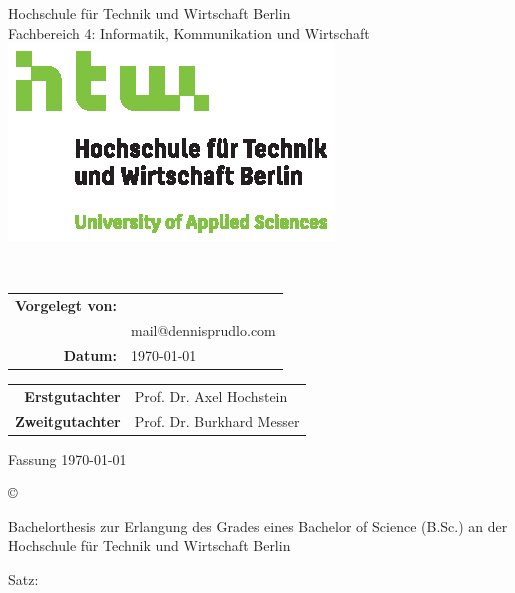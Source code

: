 \pagestyle{empty}

%
\begin{center}
	\footnotesize{%
		Hochschule für Technik und Wirtschaft Berlin\\
		Fachbereich 4: Informatik, Kommunikation und Wirtschaft
	}\\[20pt]
	\includegraphics[scale=1]{images/htwlogo}\\[40pt]
	\begin{spacing}{1.5}
		\Large{\textbf{\thetitle}}\normalsize\\[40pt]
	\end{spacing}
\end{center}
\begin{center}
	\begin{tabular}{ r l }
		\textbf{Vorgelegt von:} & \theauthor \\
		& mail@dennisprudlo.com \\[20pt]
		\textbf{Datum:} & \today
	\end{tabular}
	\mbox{}\vfill
	\begin{tabular}{ r l }
		\textbf{Erstgutachter} & Prof. Dr. Axel Hochstein \\
		\textbf{Zweitgutachter} & Prof. Dr. Burkhard Messer
	\end{tabular}
\end{center}
\clearpage

%
Fassung \today
\mbox{}\vfill
\footnotesize{%
	© \the\year{} \theauthor\par
}
\scriptsize{%
	Bachelorthesis zur Erlangung des Grades eines Bachelor of Science (B.Sc.) an der Hochschule für Technik und Wirtschaft Berlin\par
	Satz: \XeLaTeX \the\eTeXversion\eTeXrevision
}
\restoregeometry
\normalsize
\clearpage
